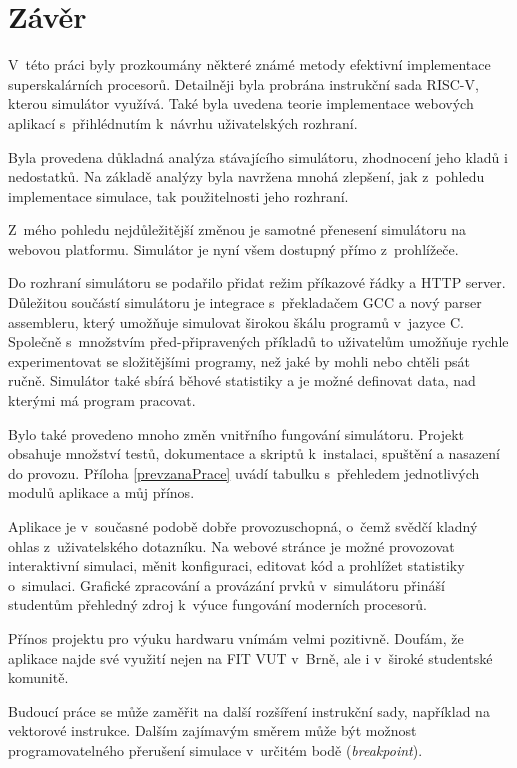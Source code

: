 
\chapter{Závěr}

V~této práci byly prozkoumány některé známé metody efektivní implementace superskalárních procesorů.
Detailněji byla probrána instrukční sada RISC-V, kterou simulátor využívá.
Také byla uvedena teorie implementace webových aplikací s~přihlédnutím k~návrhu uživatelských rozhraní.

Byla provedena důkladná analýza stávajícího simulátoru, zhodnocení jeho kladů i nedostatků.
Na základě analýzy byla navržena mnohá zlepšení, jak z~pohledu implementace simulace, tak použitelnosti jeho rozhraní.

Z~mého pohledu nejdůležitější změnou je samotné přenesení simulátoru na webovou platformu.
Simulátor je nyní všem dostupný přímo z~prohlížeče.

Do rozhraní simulátoru se podařilo přidat režim příkazové řádky a HTTP server.
Důležitou součástí simulátoru je integrace s~překladačem GCC a nový parser assembleru, který umožňuje simulovat širokou škálu programů v~jazyce C.
Společně s~množstvím před-připravených příkladů to uživatelům umožňuje rychle experimentovat se složitějšími programy, než jaké by mohli nebo chtěli psát ručně.
Simulátor také sbírá běhové statistiky a je možné definovat data, nad kterými má program pracovat.

Bylo také provedeno mnoho změn vnitřního fungování simulátoru.
Projekt obsahuje množství testů, dokumentace a skriptů k~instalaci, spuštění a nasazení do provozu.
Příloha \ref{prevzanaPrace} uvádí tabulku s~přehledem jednotlivých modulů aplikace a můj přínos.

Aplikace je v~současné podobě dobře provozuschopná, o~čemž svědčí kladný ohlas z~uživatelského dotazníku.
Na webové stránce je možné provozovat interaktivní simulaci, měnit konfiguraci, editovat kód a prohlížet statistiky o~simulaci.
Grafické zpracování a provázání prvků v~simulátoru přináší studentům přehledný zdroj k~výuce fungování moderních procesorů.

Přínos projektu pro výuku hardwaru vnímám velmi pozitivně.
Doufám, že aplikace najde své využití nejen na FIT VUT v~Brně, ale i v~široké studentské komunitě.

Budoucí práce se může zaměřit na další rozšíření instrukční sady, například na vektorové instrukce.
Dalším zajímavým směrem může být možnost programovatelného přerušení simulace v~určitém bodě (\emph{breakpoint}).
